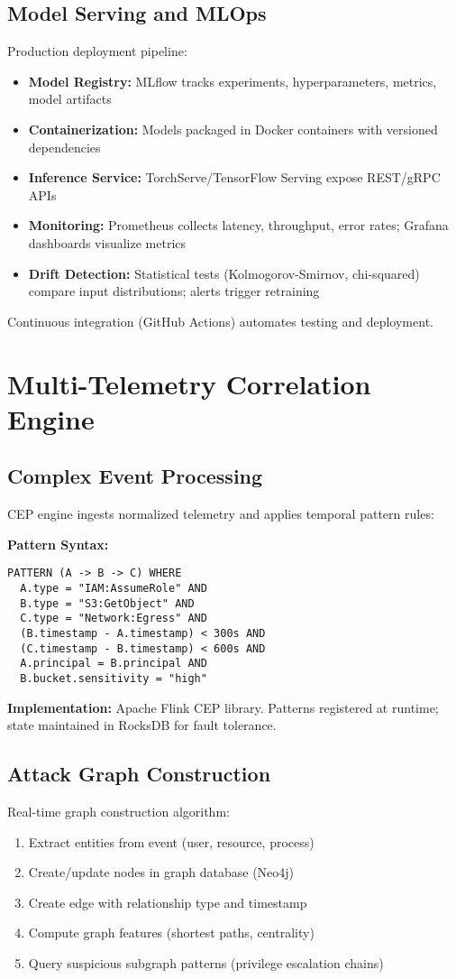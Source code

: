 \subsection{Model Serving and MLOps}
Production deployment pipeline:
\begin{itemize}
    \item \textbf{Model Registry:} MLflow tracks experiments, hyperparameters, metrics, model artifacts
    \item \textbf{Containerization:} Models packaged in Docker containers with versioned dependencies
    \item \textbf{Inference Service:} TorchServe/TensorFlow Serving expose REST/gRPC APIs
    \item \textbf{Monitoring:} Prometheus collects latency, throughput, error rates; Grafana dashboards visualize metrics
    \item \textbf{Drift Detection:} Statistical tests (Kolmogorov-Smirnov, chi-squared) compare input distributions; alerts trigger retraining
\end{itemize}

Continuous integration (GitHub Actions) automates testing and deployment.

\section{Multi-Telemetry Correlation Engine}\label{sec:method-correlation}
\subsection{Complex Event Processing}
CEP engine ingests normalized telemetry and applies temporal pattern rules:

\textbf{Pattern Syntax:}
\begin{verbatim}
PATTERN (A -> B -> C) WHERE
  A.type = "IAM:AssumeRole" AND
  B.type = "S3:GetObject" AND
  C.type = "Network:Egress" AND
  (B.timestamp - A.timestamp) < 300s AND
  (C.timestamp - B.timestamp) < 600s AND
  A.principal = B.principal AND
  B.bucket.sensitivity = "high"
\end{verbatim}

\textbf{Implementation:} Apache Flink CEP library. Patterns registered at runtime; state maintained in RocksDB for fault tolerance.

\subsection{Attack Graph Construction}
Real-time graph construction algorithm:
\begin{enumerate}
    \item Extract entities from event (user, resource, process)
    \item Create/update nodes in graph database (Neo4j)
    \item Create edge with relationship type and timestamp
    \item Compute graph features (shortest paths, centrality)
    \item Query suspicious subgraph patterns (privilege escalation chains)
\end{enumerate}

